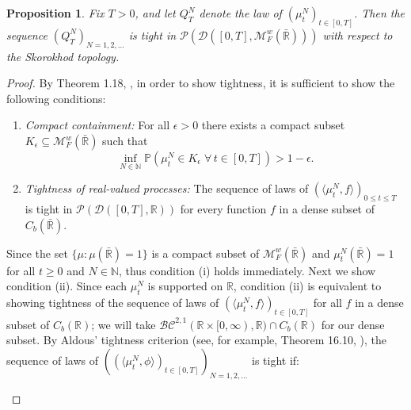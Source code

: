 \documentclass{article}
\newtheorem{propn}[theorem]{Proposition}
\newcommand{\B}[1]{\mathbb{#1}}
\newcommand{\C}[1]{\mathcal{#1}}
\begin{document}
 

\begin{propn} \label{tightness}
    Fix $T>0$, and let $Q^N_T$ denote the law of $(\mu_t^N)_{t\in [0,T]}$. Then the sequence $(Q^N_T)_{N=1,2,\ldots}$ is tight in $\C{P}(\C{D}([0,T],\C{M}^w_F(\bar{\B{R}})))$ with respect to the Skorokhod topology. 
\end{propn}

\begin{proof}
    By Theorem 1.18, \cite{etheridge}, in order to show tightness, it is sufficient to show the following conditions:
    \begin{enumerate}[noitemsep]
        \item[(i)] \textit{Compact containment:} For all $\epsilon > 0$ there exists a compact subset $K_\epsilon\subseteq \C{M}_F^w(\bar{\B{R}})$ such that $$\inf_{N\in \B{N}} \B{P}(\mu_t^N \in K_\epsilon\;  \forall \, t\in [0,T])>1-\epsilon.$$
        \item[(ii)] \textit{Tightness of real-valued processes:} The sequence of laws of $(\langle \mu_t^N,f\rangle)_{0\leq t\leq T}$ is tight in $\C{P}(\C{D}([0,T],\B{R}))$ for every function $f$ in a dense subset of $C_b(\bar{\B{R}})$.
    \end{enumerate}
    Since the set $\{\mu:\mu(\bar{\B{R}})=1\}$ is a compact subset of $\C{M}_F^w(\bar{\B{R}})$ and $\mu_t^N(\bar{\B{R}})=1$ for all $t\geq 0$ and $N\in \B{N}$, thus condition (i) holds immediately. Next we show condition (ii). Since each $\mu_t^N$ is supported on $\B{R}$, condition (ii) is equivalent to showing tightness of the sequence of laws of $(\langle \mu_t^N,f\rangle )_{t\in [0,T]}$ for all $f$ in a dense subset of $C_b(\B{R})$; we will take $\C{BC}^{2,1}(\B{R}\times [0,\infty),\B{R})\cap C_b(\B{R})$ for our dense subset. %
    By Aldous' tightness criterion (see, for example, Theorem 16.10, \cite{billingsley}), the sequence of laws of $((\langle \mu_t^N,\phi\rangle)_{t\in [0,T]})_{N=1,2,\ldots}$ is tight if:
    \begin{enumerate}[noitemsep]

\end{enumerate}
\end{proof}
\end{document}
